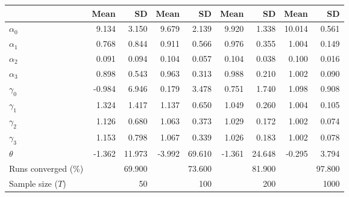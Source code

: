 
\begin{tabular}[t]{lrrrrrrrr}
\toprule
  & Mean & SD & Mean  & SD  & Mean   & SD   & Mean    & SD   \\
\midrule
$\alpha_{0}$ & 9.134 & 3.150 & 9.679 & 2.139 & 9.920 & 1.338 & 10.014 & 0.561\\
$\alpha_{1}$ & 0.768 & 0.844 & 0.911 & 0.566 & 0.976 & 0.355 & 1.004 & 0.149\\
$\alpha_{2}$ & 0.091 & 0.094 & 0.104 & 0.057 & 0.104 & 0.038 & 0.100 & 0.016\\
$\alpha_{3}$ & 0.898 & 0.543 & 0.963 & 0.313 & 0.988 & 0.210 & 1.002 & 0.090\\
$\gamma_{0}$ & -0.984 & 6.946 & 0.179 & 3.478 & 0.751 & 1.740 & 1.098 & 0.908\\
$\gamma_{1}$ & 1.324 & 1.417 & 1.137 & 0.650 & 1.049 & 0.260 & 1.004 & 0.105\\
$\gamma_{2}$ & 1.126 & 0.680 & 1.063 & 0.373 & 1.029 & 0.172 & 1.002 & 0.074\\
$\gamma_{3}$ & 1.153 & 0.798 & 1.067 & 0.339 & 1.026 & 0.183 & 1.002 & 0.078\\
$\theta$ & -1.362 & 11.973 & -3.992 & 69.610 & -1.361 & 24.648 & -0.295 & 3.794\\
Runs converged (\%) &  & 69.900 &  & 73.600 &  & 81.900 &  & 97.800\\
Sample size ($T$) &  & 50 &  & 100 &  & 200 &  & 1000\\
\bottomrule
\end{tabular}
